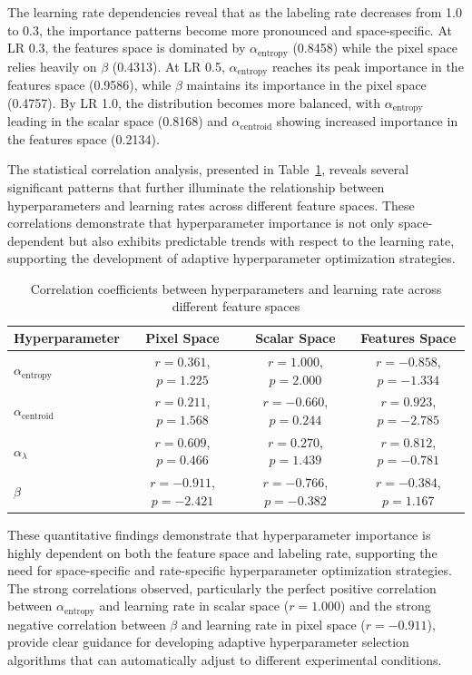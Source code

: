 The learning rate dependencies reveal that as the labeling rate
decreases from 1.0 to 0.3, the importance patterns become more
pronounced and space-specific. At LR 0.3, the features space is
dominated by $\alpha_{\text{entropy}}$ (0.8458) while the pixel space
relies heavily on $\beta$ (0.4313). At LR 0.5,
$\alpha_{\text{entropy}}$ reaches its peak importance in the features
space (0.9586), while $\beta$ maintains its importance in the pixel
space (0.4757). By LR 1.0, the distribution becomes more balanced,
with $\alpha_{\text{entropy}}$ leading in the scalar space (0.8168)
and $\alpha_{\text{centroid}}$ showing increased importance in the
features space (0.2134).

The statistical correlation analysis, presented in
Table~\ref{tab:hyperparameter_correlations}, reveals several
significant patterns that further illuminate the relationship between
hyperparameters and learning rates across different feature spaces.
These correlations demonstrate that hyperparameter importance is not
only space-dependent but also exhibits predictable trends with
respect to the learning rate, supporting the development of adaptive
hyperparameter optimization strategies.

\begin{table}[H]
  \centering
  \caption{Correlation coefficients between hyperparameters and
  learning rate across different feature spaces}
  \label{tab:hyperparameter_correlations}
  \begin{tabular}{lccc}
    \toprule
    \textbf{Hyperparameter} & \textbf{Pixel Space} & \textbf{Scalar
    Space} & \textbf{Features Space} \\
    \midrule
    $\alpha_{\text{entropy}}$ & $r=0.361$, $p=1.225$ & $r=1.000$,
    $p=2.000$ & $r=-0.858$, $p=-1.334$ \\
    $\alpha_{\text{centroid}}$ & $r=0.211$, $p=1.568$ & $r=-0.660$,
    $p=0.244$ & $r=0.923$, $p=-2.785$ \\
    $\alpha_{\lambda}$ & $r=0.609$, $p=0.466$ & $r=0.270$, $p=1.439$
    & $r=0.812$, $p=-0.781$ \\
    $\beta$ & $r=-0.911$, $p=-2.421$ & $r=-0.766$, $p=-0.382$ &
    $r=-0.384$, $p=1.167$ \\
    \bottomrule
  \end{tabular}
\end{table}

These quantitative findings demonstrate that hyperparameter
importance is highly dependent on both the feature space and labeling
rate, supporting the need for space-specific and rate-specific
hyperparameter optimization strategies. The strong correlations
observed, particularly the perfect positive correlation between
$\alpha_{\text{entropy}}$ and learning rate in scalar space
($r=1.000$) and the strong negative correlation between $\beta$ and
learning rate in pixel space ($r=-0.911$), provide clear guidance for
developing adaptive hyperparameter selection algorithms that can
automatically adjust to different experimental conditions.
